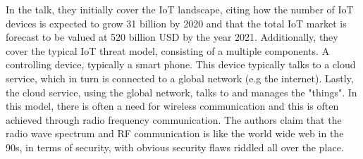 In the talk, they initially cover the IoT landscape, citing how the number of IoT devices is expected to grow 31 billion by 2020 and that the total IoT market is forecast to be valued at 520 billion USD by the year 2021. Additionally, they cover the typical IoT threat model, consisting of a multiple components. A controlling device, typically a smart phone. This device typically talks to a cloud service, which in turn is connected to a global network (e.g the internet). Lastly, the cloud service, using the global network, talks to and manages the "things". In this model, there is often a need for wireless communication and this is often achieved through radio frequency communication. The authors claim that the radio wave spectrum and RF communication is like the world wide web in the 90s, in terms of security, with obvious security flaws riddled all over the place.

